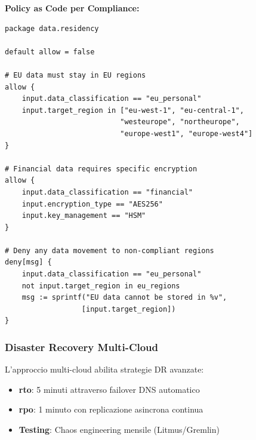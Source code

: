 \textbf{Policy as Code per Compliance:}
\begin{lstlisting}[caption={OPA Policy per Data Residency},label={lst:opa_residency}]
package data.residency

default allow = false

# EU data must stay in EU regions
allow {
    input.data_classification == "eu_personal"
    input.target_region in ["eu-west-1", "eu-central-1", 
                           "westeurope", "northeurope",
                           "europe-west1", "europe-west4"]
}

# Financial data requires specific encryption
allow {
    input.data_classification == "financial"
    input.encryption_type == "AES256"
    input.key_management == "HSM"
}

# Deny any data movement to non-compliant regions
deny[msg] {
    input.data_classification == "eu_personal"
    not input.target_region in eu_regions
    msg := sprintf("EU data cannot be stored in %v", 
                  [input.target_region])
}
\end{lstlisting}

\subsubsection{\texorpdfstring{Disaster Recovery Multi-Cloud}{3.4.2.6 - Disaster Recovery Multi-Cloud}}

L'approccio multi-cloud abilita strategie DR avanzate:

\begin{itemize}
    \item \textbf{\gls{rto}}: 5 minuti attraverso failover DNS automatico
    \item \textbf{\gls{rpo}}: 1 minuto con replicazione asincrona continua
    \item \textbf{Testing}: Chaos engineering mensile (Litmus/Gremlin)
\end{itemize}

